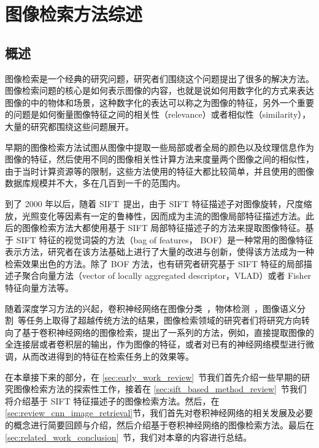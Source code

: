 
\chapter{图像检索方法综述}\label{chapter:overview_related_work}

\section{概述}
图像检索是一个经典的研究问题，研究者们围绕这个问题提出了很多的解决方法。图像检索问题的核心是如何表示图像的内容，也就是说如何用数字化的方式来表达图像的中的物体和场景，这种数字化的表达可以称之为图像的特征，另外一个重要的问题是如何衡量图像特征之间的相关性（relevance）或者相似性（similarity），大量的研究都围绕这些问题展开。

早期的图像检索方法试图从图像中提取一些局部或者全局的颜色以及纹理信息作为图像的特征，然后使用不同的图像相关性计算方法来度量两个图像之间的相似性，由于当时计算资源等的限制，这些方法使用的特征大都比较简单，并且使用的图像数据库规模并不大，多在几百到一千的范围内。

到了 2000 年以后，随着 SIFT~\cite{Lowe1999ObjectRF}提出，由于 SIFT 特征描述子对图像旋转，尺度缩放，光照变化等因素有一定的鲁棒性，因而成为主流的图像局部特征描述方法。此后的图像检索方法大都使用基于 SIFT 局部特征描述子的方法来提取图像特征。基于 SIFT 特征的视觉词袋的方法（bag of features， BOF）是一种常用的图像特征表示方法，研究者在该方法基础上进行了大量的改进与创新，使得该方法成为一种检索效果出色的方法。除了 BOF 方法，也有研究者研究基于 SIFT 特征的局部描述子聚合向量方法（vector of locally aggregated descriptor，VLAD）或者 Fisher 特征向量方法等。

随着深度学习方法的兴起，卷积神经网络在图像分类~\cite{Russakovsky2015ImageNetLS,Simonyan2014VeryDC,Szegedy2015GoingDW,He2016DeepRL}，物体检测~\cite{Liu2016SSDSS,Redmon2016YouOL,Lin2017FocalLF,Ren2017FasterRT}，图像语义分割~\cite{Shelhamer2017FullyCN,Chen2018DeepLabSI,Noh2015LearningDN}等任务上取得了超越传统方法的结果，图像检索领域的研究者们将研究方向转向了基于卷积神经网络的图像检索，提出了一系列的方法，例如，直接提取图像的全连接层或者卷积层的输出，作为图像的特征，或者对已有的神经网络模型进行微调，从而改进得到的特征在检索任务上的效果等。

在本章接下来的部分，在 \ref{sec:early_work_review}~节我们首先介绍一些早期的研究图像检索方法的探索性工作，接着在 \ref{sec:sift_based_method_review}~节我们将介绍基于 SIFT 特征描述子的图像检索方法。然后，在 \ref{sec:review_cnn_image_retrieval}节，我们首先对卷积神经网络的相关发展及必要的概念进行简要回顾与介绍，然后介绍基于卷积神经网络的图像检索方法。最后在 \ref{sec:related_work_conclusion}~节，我们对本章的内容进行总结。

